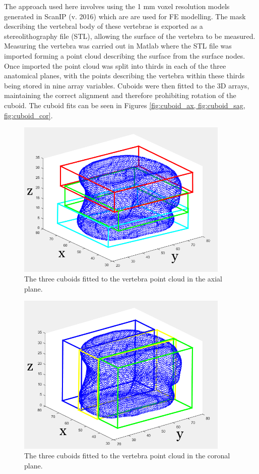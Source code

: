 The approach used here involves using the 1 mm voxel resolution models generated in ScanIP (v. 2016) which are are used for FE modelling.
The mask describing the vertebral body of these vertebrae is exported as a stereolithography file (STL), allowing the surface of the vertebra to be measured.
Measuring the vertebra was carried out in Matlab where the STL file was imported forming a point cloud describing the surface from the surface nodes.
Once imported the point cloud was split into thirds in each of the three anatomical planes, with the points describing the vertebra within these thirds being stored in nine array variables.
Cuboids were then fitted to the 3D arrays, maintaining the correct alignment and therefore prohibiting rotation of the cuboid.
The cuboid fits can be seen in Figures \ref{fig:cuboid_ax, fig:cuboid_sag, fig:cuboid_cor}.


\begin{figure}[ht!]
  \centering
  \includegraphics[width=4in]{Chapters/Chapter_PCA_images/Cuboid_fit_axial.png}
  \caption{The three cuboids fitted to the vertebra point cloud in the axial plane.}
  \label{fig:cuboid_ax}
\end{figure}

\begin{figure}[ht!]
  \centering
  \includegraphics[width=4in]{Chapters/Chapter_PCA_images/Cuboid_fit_coronal.png}
  \caption{The three cuboids fitted to the vertebra point cloud in the coronal plane.}
  \label{fig:cuboid_cor}
\end{figure}

